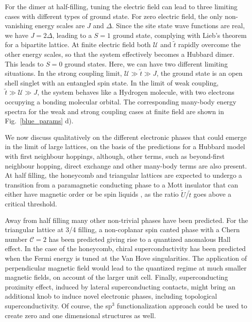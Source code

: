 For the dimer at half-filling, tuning the electric field can lead to three limiting cases with different types of ground state. For zero electric field, the only non-vanishing energy scales are $J$ and $\Delta$. Since the site state wave functions are real, we have $J=2\Delta$, leading to a $S=1$ ground state, complying with Lieb's theorem for a bipartite lattice\cite{Lieb1989}. 
%
At finite electric field both $\mathcal{U}$ and $\tilde{t}$
rapidly overcome the other energy scales, so that the system effectively becomes a Hubbard dimer. This leads to $S=0$ ground states. Here, we can have two different limiting situations\cite{Ortiz2018}. In the strong coupling limit, $\mathcal{U}\gg\tilde{t}\gg J$, the ground state is an open shell singlet with an entangled spin state. In the limit of weak coupling, $\tilde{t}\gg \mathcal{U}\gg J$, the system behaves like a Hydrogen molecule, with two electrons occupying a bonding molecular orbital. The corresponding many-body energy spectra for the weak and strong coupling cases at finite field are shown in Fig.~\ref{blue_params} d).



We now discuss qualitatively on the different electronic phases that could emerge in the limit of large lattices, on the basis of the predictions for a Hubbard model with first neighbour hoppings, although, other terms, such as beyond-first neighbour hopping, direct exchange and other many-body terms are also present. At half filling, the honeycomb and triangular lattices are expected to undergo a transition from a paramagnetic conducting phase to a Mott insulator that can either have magnetic order \cite{sorella1992} or be spin liquids \cite{Sahebsara08}, as the ratio $\tilde{U}/\tilde{t}$ goes above a critical threshold.

Away from half filling many other non-trivial phases have been predicted. For the triangular lattice at 3/4 filling, a non-coplanar spin canted phase with a Chern number $\mathcal{C}=2$ has been predicted\cite{martin08} giving rise to a quantized anomalous Hall effect. In the case of the honeycomb, chiral superconductivity has been predicted when the Fermi energy is tuned at the Van Hove singularities\cite{nandkishore2012}.
The application of perpendicular magnetic field would lead to the quantized regime at much smaller magnetic fields, on account of the larger unit cell. Finally, superconducting proximity effect, induced by lateral superconducting contacts, might bring an additional knob to induce novel electronic phases, including topological superconductivity.\cite{san2015}
Of course, the sp$^3$ functionalization approach could be used to create zero and one dimensional structures as well.
 
